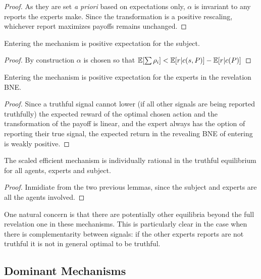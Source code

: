 \begin{proof}
	As they are set \emph{a priori} based on expectations only, $\alpha$ is invariant to any reports the experts make. Since the transformation is a positive rescaling, whichever report maximizes payoffs remains unchanged. 
\end{proof}


\begin{lem}
	Entering the mechanism is positive expectation for the subject.
\end{lem}

\begin{proof}
  By construction $\alpha$ is chosen so that $\operatorname*{\mathbb E}[\sum \rho_i] < \operatorname*{\mathbb E}[r|c(s,P)] - \operatorname*{\mathbb E}[r|c(P)]$
\end{proof}


\begin{lem}
	Entering the mechanism is positive expectation for the experts in the revelation BNE.
\end{lem}

\begin{proof}
Since a truthful signal cannot lower (if all other signals are being reported truthfully) the expected reward of the optimal chosen action and the transformation of the payoff is linear, and the expert always has the option of reporting their true signal, the expected return in the revealing BNE of entering is weakly positive.
\end{proof}


\begin{thm}
	The scaled efficient mechanism is individually rational in the truthful equilibrium for all agents, experts and subject.
\end{thm}

\begin{proof}
Inmidiate from the two previous lemmas, since the subject and experts are all the agents involved.
\end{proof}

One natural concern is that there are potentially other equilibria beyond the full revelation one in these mechanisms. This is particularly clear in the case when there is complementarity between signals: if the other experts reports are not truthful it is not in general optimal to be truthful.


\subsection{Dominant Mechanisms}

